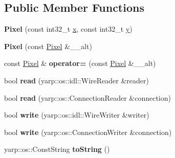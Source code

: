 \subsection*{Public Member Functions}
\begin{DoxyCompactItemize}
\item 
{\bfseries Pixel} (const int32\+\_\+t \hyperlink{classyarp_1_1sig_1_1Pixel_a4d6a5b0c693035c4012aa15e8f8b4b64}{x}, const int32\+\_\+t \hyperlink{classyarp_1_1sig_1_1Pixel_a2ac1d9f1602f323fb9ca9fe62541aeb2}{y})\label{classyarp_1_1sig_1_1Pixel_a892add3151640573f74252f120e60d52}

\item 
{\bfseries Pixel} (const \hyperlink{classyarp_1_1sig_1_1Pixel}{Pixel} \&\+\_\+\+\_\+alt)\label{classyarp_1_1sig_1_1Pixel_ad41b620ffa2be8a6440bb8c287be6a21}

\item 
const \hyperlink{classyarp_1_1sig_1_1Pixel}{Pixel} \& {\bfseries operator=} (const \hyperlink{classyarp_1_1sig_1_1Pixel}{Pixel} \&\+\_\+\+\_\+alt)\label{classyarp_1_1sig_1_1Pixel_a3f766f3526afe7a8359cd8a91def844d}

\item 
bool {\bfseries read} (yarp\+::os\+::idl\+::\+Wire\+Reader \&reader)\label{classyarp_1_1sig_1_1Pixel_af3d1087eb2cc26f64466621bd448fb41}

\item 
bool {\bfseries read} (yarp\+::os\+::\+Connection\+Reader \&connection)\label{classyarp_1_1sig_1_1Pixel_afff7ebed51d888d01dc75cf6093d1d3e}

\item 
bool {\bfseries write} (yarp\+::os\+::idl\+::\+Wire\+Writer \&writer)\label{classyarp_1_1sig_1_1Pixel_a2aa54d8b318270d615aacb046512eb20}

\item 
bool {\bfseries write} (yarp\+::os\+::\+Connection\+Writer \&connection)\label{classyarp_1_1sig_1_1Pixel_a15f5eca483f6ee5a90bf2de68ec75c8e}

\item 
yarp\+::os\+::\+Const\+String {\bfseries to\+String} ()\label{classyarp_1_1sig_1_1Pixel_a6236575491a91f4a48ecc47e41fa3de3}

\end{DoxyCompactItemize}
